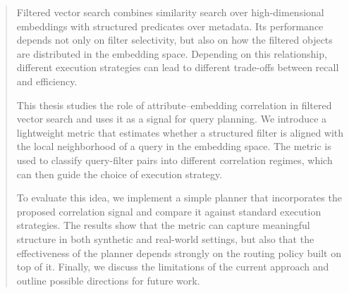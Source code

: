 \begin{abstract}
Filtered vector search combines similarity search over high-dimensional embeddings with structured predicates over metadata. 
Its performance depends not only on filter selectivity, but also on how the filtered objects are distributed in the embedding space. 
Depending on this relationship, different execution strategies can lead to different trade-offs between recall and efficiency.

This thesis studies the role of attribute--embedding correlation in filtered vector search and uses it as a signal for query planning.
We introduce a lightweight metric that estimates whether a structured filter is aligned with the local neighborhood of a query in the embedding space.
The metric is used to classify query-filter pairs into different correlation regimes, which can then guide the choice of execution strategy.

To evaluate this idea, we implement a simple planner that incorporates the proposed correlation signal and compare it against standard execution strategies.
The results show that the metric can capture meaningful structure in both synthetic and real-world settings, but also that the effectiveness of the planner depends strongly on the routing policy built on top of it.
Finally, we discuss the limitations of the current approach and outline possible directions for future work.
\end{abstract}